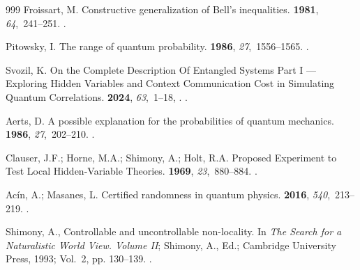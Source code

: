 \documentclass[entropy,article,submit,moreauthors,pdftex]{Definitions/mdpi}
\begin{document}
\begin{thebibliography}{999}
Froissart, M.
\newblock Constructive generalization of {B}ell's inequalities.
 {\bf 1981}, {\em
  64},~241--251.
.

Pitowsky, I.
\newblock The range of quantum probability.
 {\bf 1986}, {\em
  27},~1556--1565.
.

Svozil, K.
\newblock On the Complete Description Of Entangled Systems Part {I} ---
  {E}xploring Hidden Variables and Context Communication Cost in Simulating
  Quantum Correlations.
 {\bf 2024}, {\em
  63},~1--18,  \href{http://arxiv.org/abs/arXiv:2209.09590}{{\normalfont
  [arXiv:2209.09590]}}.
.

Aerts, D.
\newblock A possible explanation for the probabilities of quantum mechanics.
 {\bf 1986}, {\em 27},~202--210.
.

Clauser, J.F.; Horne, M.A.; Shimony, A.; Holt, R.A.
\newblock Proposed Experiment to Test Local Hidden-Variable Theories.
 {\bf 1969}, {\em 23},~880--884.
.

Ac{\'i}n, A.; Masanes, L.
\newblock Certified randomness in quantum physics.
 {\bf 2016}, {\em 540},~213--219.
.

Shimony, A., Controllable and uncontrollable non-locality.
\newblock In {\em The Search for a Naturalistic World View. {V}olume {II}};
  Shimony, A., Ed.; Cambridge University Press,  1993; Vol.~2, pp. 130--139.
.

\end{thebibliography}




%
%
%
\end{document}
